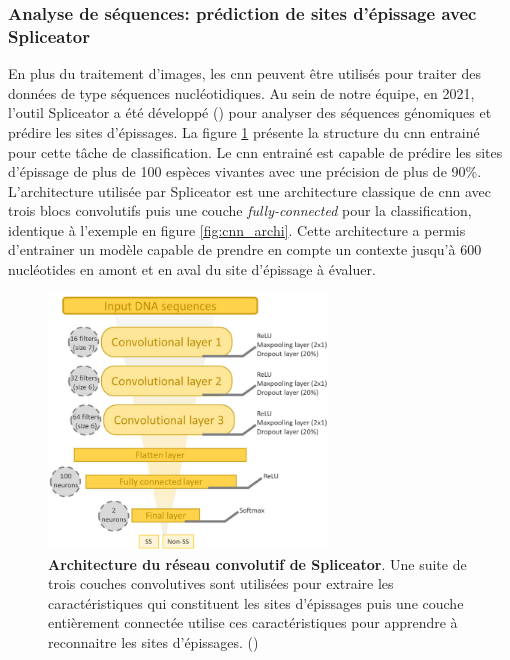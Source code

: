 \subsubsection{Analyse de séquences: prédiction de sites d'épissage avec Spliceator}
En plus du traitement d'images, les \gls{cnn} peuvent être utilisés pour traiter des données de type séquences nucléotidiques. Au sein de notre équipe, en 2021, l'outil Spliceator a été développé (\cite{scalzitti_spliceator_2021}) pour analyser des séquences génomiques et prédire les sites d'épissages. La figure \ref{fig:splice_archi} présente la structure du \gls{cnn} entrainé pour cette tâche de classification. Le \gls{cnn} entrainé est capable de prédire les sites d'épissage de plus de 100 espèces vivantes avec une précision de plus de 90\%. L'architecture utilisée par Spliceator est une architecture classique de \gls{cnn} avec trois blocs convolutifs puis une couche \textit{fully-connected} pour la classification, identique à l'exemple en figure \ref{fig:cnn_archi}. Cette architecture a permis d'entrainer un modèle capable de prendre en compte un contexte jusqu'à 600 nucléotides en amont et en aval du site d'épissage à évaluer.
\begin{figure}[!ht]
 \centering
 \includegraphics[width=0.66\textwidth]{figures/spliceator_nn.png}
 \caption[Architecture du réseau convolutionel de Spliceator]{\textbf{Architecture du réseau convolutif de Spliceator}. Une suite de trois couches convolutives sont utilisées pour extraire les caractéristiques qui constituent les sites d'épissages puis une couche entièrement connectée utilise ces caractéristiques pour apprendre à reconnaitre les sites d'épissages. (\cite{scalzitti_spliceator_2021})}
 \label{fig:splice_archi}
\end{figure}

